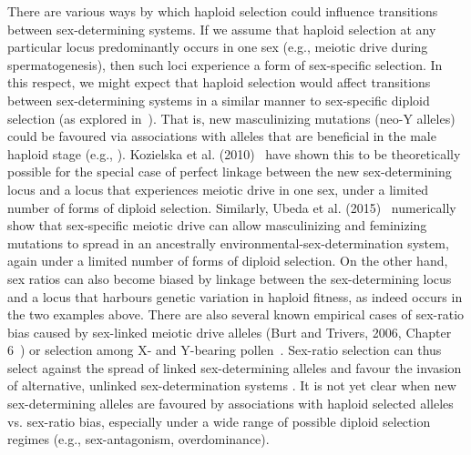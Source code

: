 \documentclass[10pt,letterpaper]{article}
\begin{document}
There are various ways by which haploid selection could influence transitions between sex-determining systems. 
If we assume that haploid selection at any particular locus predominantly occurs in one sex (e.g., meiotic drive during spermatogenesis), then such loci experience a form of sex-specific selection. 
In this respect, we might expect that haploid selection would affect transitions between sex-determining systems in a similar manner to sex-specific diploid selection (as explored in~\cite{vanDoorn:2007eu,vanDoorn:2010hu}). 
That is, new masculinizing mutations (neo-Y alleles) could be favoured via associations with alleles that are beneficial in the male haploid stage (e.g., \cite{Ubeda:2015fx}). 
Kozielska et al. (2010)~\cite{Kozielska:2010vm} have shown this to be theoretically possible for the special case of perfect linkage between the new sex-determining locus and a locus that experiences meiotic drive in one sex, under a limited number of forms of diploid selection.
Similarly, Ubeda et al. (2015)~\cite{Ubeda:2015fx} numerically show that sex-specific meiotic drive can allow masculinizing and feminizing mutations to spread in an ancestrally environmental-sex-determination system, again under a limited number of forms of diploid selection. 
On the other hand, sex ratios can also become biased by linkage between the sex-determining locus and a locus that harbours genetic variation in haploid fitness, as indeed occurs in the two examples above.
There are also several known empirical cases of sex-ratio bias caused by sex-linked meiotic drive alleles (Burt and Trivers, 2006, Chapter 6~\cite{Burt:2006}) or selection among X- and Y-bearing pollen~\cite{Lloyd:1974tz,Conn:1981uw,Stehlik:2005ul,Stehlik:2006to,Field:2012fd,Field:2013cc}. 
Sex-ratio selection can thus select against the spread of linked sex-determining alleles and favour the invasion of alternative, unlinked sex-determination systems \cite{Kozielska:2010vm,Ubeda:2015fx}.
It is not yet clear when new sex-determining alleles are favoured by associations with haploid selected alleles vs. sex-ratio bias, especially under a wide range of possible diploid selection regimes (e.g., sex-antagonism, overdominance).	
\end{document}
